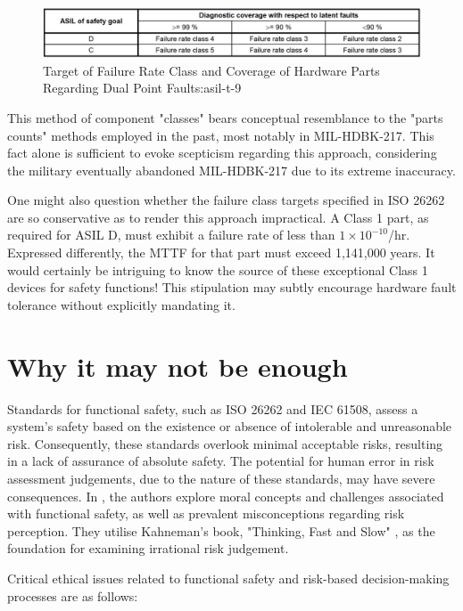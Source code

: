 \documentclass[./dissertation.tex]{subfiles}
\begin{document}
\begin{figure}[H]
\centering
\includegraphics[width=\linewidth]{subfiles/imgs/asil-t-9.png}
\caption{Target of Failure Rate Class and Coverage of Hardware Parts Regarding Dual Point Faults:asil-t-9}
\end{figure}

This method of component "classes" bears conceptual resemblance to the "parts counts" methods employed in the past, most notably in MIL-HDBK-217. This fact alone is sufficient to evoke scepticism regarding this approach, considering the military eventually abandoned MIL-HDBK-217 due to its extreme inaccuracy.

One might also question whether the failure class targets specified in ISO 26262 are so conservative as to render this approach impractical. A Class 1 part, as required for ASIL D, must exhibit a failure rate of less than $1\times10^{-10}$/hr. Expressed differently, the MTTF for that part must exceed 1,141,000 years. It would certainly be intriguing to know the source of these exceptional Class 1 devices for safety functions! This stipulation may subtly encourage hardware fault tolerance without explicitly mandating it.



\section{Why it may not be enough}
Standards for functional safety, such as ISO 26262 and IEC 61508, assess a system's safety based on the existence or absence of intolerable and unreasonable risk. Consequently, these standards overlook minimal acceptable risks, resulting in a lack of assurance of absolute safety. The potential for human error in risk assessment judgements, due to the nature of these standards, may have severe consequences. In \cite{7958474}, the authors explore moral concepts and challenges associated with functional safety, as well as prevalent misconceptions regarding risk perception. They utilise Kahneman's book, "Thinking, Fast and Slow" \cite{daniel2017thinking}, as the foundation for examining irrational risk judgement.

Critical ethical issues related to functional safety and risk-based decision-making processes are as follows:
\end{document}
